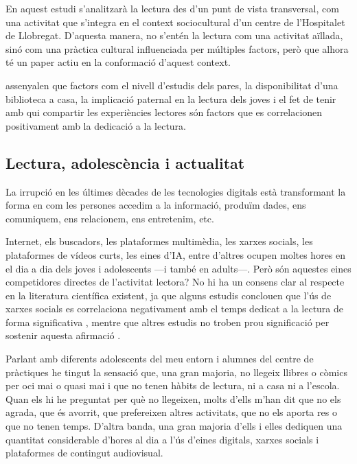 \documentclass[12pt]{article}
\begin{document}
En aquest estudi s'analitzarà la lectura des d'un punt de vista transversal, com una activitat que s'integra en el context sociocultural d'un centre de l'Hospitalet de Llobregat. D'aquesta manera, no s'entén la lectura com una activitat aïllada, sinó com una pràctica cultural influenciada per múltiples factors, però que alhora té un paper actiu en la conformació d'aquest context.

\textcite{shutaleva} assenyalen que factors com el nivell d'estudis dels pares, la disponibilitat d'una biblioteca a casa, la implicació paternal en la lectura dels joves i el fet de tenir amb qui compartir les experiències lectores són factors que es correlacionen positivament amb la dedicació a la lectura.

\subsection{Lectura, adolescència i actualitat}

La irrupció en les últimes dècades de les tecnologies digitals està transformant la forma en com les persones accedim a la informació, produïm dades, ens comuniquem, ens relacionem, ens entretenim, etc.

Internet, els buscadors, les plataformes multimèdia, les xarxes socials, les plataformes de vídeos curts, les eines d'IA, entre d'altres ocupen moltes hores en el dia a dia dels joves i adolescents \parencite{shutaleva} ---i també en adults---. Però són aquestes eines competidores directes de l'activitat lectora? No hi ha un consens clar al respecte en la literatura científica existent, ja que alguns estudis conclouen que l'ús de xarxes socials es correlaciona negativament amb el temps dedicat a la lectura de forma significativa \parencite{owusu_sm}, mentre que altres estudis no troben prou significació per sostenir aquesta afirmació \parencite{shutaleva}. 

Parlant amb diferents adolescents del meu entorn i alumnes del centre de pràctiques he tingut la sensació que, una gran majoria, no llegeix llibres o còmics per oci mai o quasi mai i que no tenen hàbits de lectura, ni a casa ni a l'escola. Quan els hi he preguntat per què no llegeixen, molts d'ells m'han dit que no els agrada, que és avorrit, que prefereixen altres activitats, que no els aporta res o que no tenen temps. D'altra banda, una gran majoria d'ells i elles dediquen una quantitat considerable d'hores al dia a l'ús d'eines digitals, xarxes socials i plataformes de contingut audiovisual.
\end{document}
